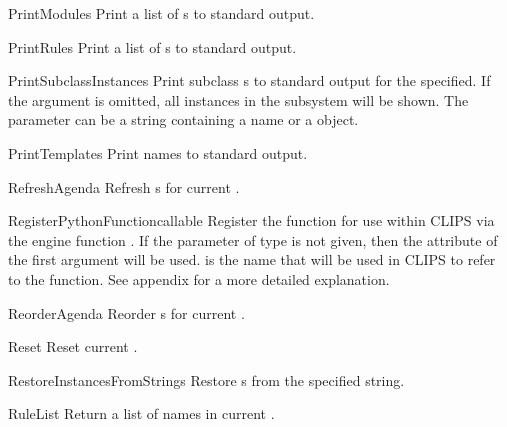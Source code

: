 \begin{funcdesc}{PrintModules}{}
Print a list of s to standard output.
\end{funcdesc}

\begin{funcdesc}{PrintRules}{}
Print a list of s to standard output.
\end{funcdesc}

\begin{funcdesc}{PrintSubclassInstances}{}
Print subclass s to standard output for the
 specified. If the  argument is omitted, all
instances in the subsystem will be shown. The  parameter can
be a string containing a  name or a  object.
\end{funcdesc}

\begin{funcdesc}{PrintTemplates}{}
Print  names to standard output.
\end{funcdesc}

\begin{funcdesc}{RefreshAgenda}{}
Refresh  s for current .
\end{funcdesc}

\begin{funcdesc}{RegisterPythonFunction}{callable }
Register the function  for use within CLIPS via the
engine function . If the parameter  of type
 is not given, then the  attribute of the
first argument will be used.  is the name that will be used
in CLIPS to refer to the function. See appendix for a more detailed
explanation.
\end{funcdesc}

\begin{funcdesc}{ReorderAgenda}{}
Reorder  s for current .
\end{funcdesc}

\begin{funcdesc}{Reset}{}
Reset current .
\end{funcdesc}

\begin{funcdesc}{RestoreInstancesFromString}{s}
Restore s from the specified string.
\end{funcdesc}

\begin{funcdesc}{RuleList}{}
Return a list of  names in current .
\end{funcdesc}

